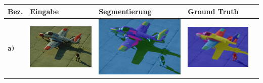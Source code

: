 \begin{table}[h!]
	\setlength\tabcolsep{0pt}
	\begin{tabularx}{\textwidth}{>{\centering}m{}
			>{\centering}m{}
			>{\centering}m{}
			>{\centering}m{}
			>{\centering\arraybackslash}m{}}
		\toprule
		Bez. &
		Eingabe & 
		Segmentierung &
		Ground Truth \\
		\midrule
		\texttt{a)} &
		\includegraphics[width=0.9\linewidth]{images/bsd/37073.jpg} &
		\includegraphics[width=0.9\linewidth]{images/gen/bsd_results/37073.jpg_seg.png} &
		\includegraphics[width=0.9\linewidth]{images/gen/bsd_results/37073.jpg_gt_1.png} \\
		

\end{tabularx}
\end{table}
